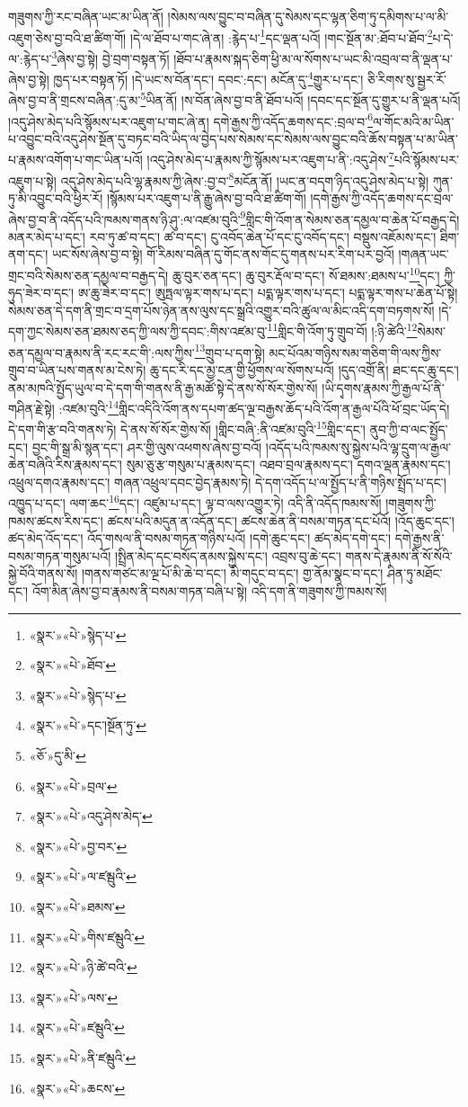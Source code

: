གཟུགས་ཀྱི་རང་བཞིན་ཡང་མ་ཡིན་ནོ། །སེམས་ལས་བྱུང་བ་བཞིན་དུ་སེམས་དང་ལྷན་ཅིག་ཏུ་དམིགས་པ་ལ་མི་འཇུག་ཅེས་བྱ་བའི་ཐ་ཚིག་གོ། །དེ་ལ་ཐོབ་པ་གང་ཞེ་ན། :རྙེད་པ་\footnote{«སྣར་»«པེ་»སྙེད་པ་}དང་ལྡན་པའོ། །གང་སྔོན་མ་:ཐོབ་པ་ཐོབ་\footnote{«སྣར་»«པེ་»ཐོབ་}པ་དེ་ལ་:རྙེད་པ་\footnote{«སྣར་»«པེ་»སྙེད་པ་}ཞེས་བྱ་སྟེ། བྱེ་བྲག་བསྟན་ཏོ། །ཐོབ་པ་རྣམས་སྐད་ཅིག་ཕྱི་མ་ལ་སོགས་པ་ཡང་མི་འབྲལ་བ་ནི་ལྡན་པ་ཞེས་བྱ་སྟེ། ཁྱད་པར་བསྟན་ཏོ། །དེ་ཡང་ས་བོན་དང་། དབང་:དང་། མངོན་དུ་\footnote{«སྣར་»«པེ་»དང་།སྔོན་ཏུ་}གྱུར་པ་དང་། ཅི་རིགས་སུ་སྦྱར་རོ་ཞེས་བྱ་བ་ནི་གྲངས་བཞིན་:དུ་མ་\footnote{«ཅོ་»དུ་མི་}ཡིན་ནོ། །ས་བོན་ཞེས་བྱ་བ་ནི་ཐོབ་པའོ། །དབང་དང་སྔོན་དུ་གྱུར་པ་ནི་ལྡན་པའོ། །འདུ་ཤེས་མེད་པའི་སྙོམས་པར་འཇུག་པ་གང་ཞེ་ན། དགེ་རྒྱས་ཀྱི་འདོད་ཆགས་དང་:བྲལ་བ་\footnote{«སྣར་»«པེ་»བྲལ་}ལ་གོང་མའི་མ་ཡིན་པ་འབྱུང་བའི་འདུ་ཤེས་སྔོན་དུ་བཏང་བའི་ཡིད་ལ་བྱེད་པས་སེམས་དང་སེམས་ལས་བྱུང་བའི་ཆོས་བསྟན་པ་མ་ཡིན་པ་རྣམས་འགོག་པ་གང་ཡིན་པའོ། །འདུ་ཤེས་མེད་པ་རྣམས་ཀྱི་སྙོམས་པར་འཇུག་པ་ནི་:འདུ་ཤེས་\footnote{«སྣར་»«པེ་»འདུ་ཤེས་མེད་}པའི་སྙོམས་པར་འཇུག་པ་སྟེ། འདུ་ཤེས་མེད་པའི་ལྷ་རྣམས་ཀྱི་ཞེས་:བྱ་བ་\footnote{«སྣར་»«པེ་»བྱ་བར་}མངོན་ནོ། །ཡང་ན་བདག་ཉིད་འདུ་ཤེས་མེད་པ་སྟེ། ཀུན་ཏུ་མི་འབྱུང་བའི་ཕྱིར་རོ། །སྙོམས་པར་འཇུག་པ་ནི་རྒྱུ་ཞེས་བྱ་བའི་ཐ་ཚིག་གོ། །དགེ་རྒྱས་ཀྱི་འདོད་ཆགས་དང་བྲལ་ཞེས་བྱ་བ་ནི་འདོད་པའི་ཁམས་གནས་ཉི་ཤུ་:ལ་འཛམ་བུའི་\footnote{«སྣར་»«པེ་»ལ་ཛམྦུའི་}གླིང་གི་འོག་ན་སེམས་ཅན་དམྱལ་བ་ཆེན་པོ་བརྒྱད་དེ། མནར་མེད་པ་དང་། རབ་ཏུ་ཚ་བ་དང་། ཚ་བ་དང་། ངུ་འབོད་ཆེན་པོ་དང་ངུ་འབོད་དང་། བསྡུས་འཇོམས་དང་། ཐིག་ནག་དང་། ཡང་སོས་ཞེས་བྱ་བ་སྟེ། གོ་རིམས་བཞིན་དུ་གོང་ནས་གོང་དུ་གནས་པར་རིག་པར་བྱའོ། །གཞན་ཡང་གྲང་བའི་སེམས་ཅན་དམྱལ་བ་བརྒྱད་དེ། ཆུ་བུར་ཅན་དང་། ཆུ་བུར་རྡོལ་བ་དང་། སོ་ཐམས་:ཐམས་པ་\footnote{«སྣར་»«པེ་»ཐམས་}དང་། ཀྱི་ཧུད་ཟེར་བ་དང་། ཨ་ཆུ་ཟེར་བ་དང་། ཨུཏྤལ་ལྟར་གས་པ་དང་། པདྨ་ལྟར་གས་པ་དང་། པདྨ་ལྟར་གས་པ་ཆེན་པོ་སྟེ། སེམས་ཅན་དེ་དག་ནི་གྲང་བ་དྲག་པོས་ཉེན་ནས་ལུས་དང་སྒྲའི་འགྱུར་བའི་ཚུལ་ལ་མིང་འདི་དག་བཏགས་སོ། །དེ་དག་ཀྱང་སེམས་ཅན་ཐམས་ཅད་ཀྱི་ལས་ཀྱི་དབང་:གིས་འཛམ་བུ་\footnote{«སྣར་»«པེ་»གིས་ཛམྦུའི་}གླིང་གི་འོག་ཏུ་གྲུབ་བོ། །:ཉི་ཚེའི་\footnote{«སྣར་»«པེ་»ཉི་ཚེ་བའི་}སེམས་ཅན་དམྱལ་བ་རྣམས་ནི་རང་རང་གི་:ལས་ཀྱིས་\footnote{«སྣར་»«པེ་»ལས་}གྲུབ་པ་དག་སྟེ། མང་པོའམ་གཉིས་སམ་གཅིག་གི་ལས་ཀྱིས་གྲུབ་བ་ཡིན་པས་གནས་མ་ངེས་ཏེ། ཆུ་དང་རི་དང་མྱ་ངན་གྱི་ཕྱོགས་ལ་སོགས་པའོ། །དུད་འགྲོ་ནི། ཐང་དང་ཆུ་དང་། ནམ་མཁའི་སྤྱོད་ཡུལ་བ་དེ་དག་གི་གནས་ནི་རྒྱ་མཚོ་སྟེ་དེ་ནས་སོ་སོར་གྱེས་སོ། །ཡི་དྭགས་རྣམས་ཀྱི་རྒྱལ་པོ་ནི་གཤིན་རྗེ་སྟེ། :འཛམ་བུའི་\footnote{«སྣར་»«པེ་»ཛམྦུའི་}གླིང་འདིའི་འོག་ནས་དཔག་ཚད་ལྔ་བརྒྱས་ཆོད་པའི་འོག་ན་རྒྱལ་པོའི་ཕོ་བྲང་ཡོད་དེ། དེ་དག་གི་རྩ་བའི་གནས་ཏེ། དེ་ནས་སོ་སོར་གྱེས་སོ། །གླིང་བཞི་:ནི་འཛམ་བུའི་\footnote{«སྣར་»«པེ་»ནི་ཛམྦུའི་}གླིང་དང་། ནུབ་ཀྱི་བ་ལང་སྤྱོད་དང་། བྱང་གི་སྒྲ་མི་སྙན་དང་། ཤར་གྱི་ལུས་འཕགས་ཞེས་བྱ་བའོ། །འདོད་པའི་ཁམས་སུ་སྐྱེས་པའི་ལྷ་དྲུག་ལ་རྒྱལ་ཆེན་བཞིའི་རིས་རྣམས་དང་། སུམ་ཅུ་རྩ་གསུམ་པ་རྣམས་དང་། འཐབ་བྲལ་རྣམས་དང་། དགའ་ལྡན་རྣམས་དང་། འཕྲུལ་དགའ་རྣམས་དང་། གཞན་འཕྲུལ་དབང་བྱེད་རྣམས་ཏེ། དེ་དག་འདོད་པ་ལ་སྤྱོད་པ་ནི་གཉིས་སྤྲོད་པ་དང་། འཁྱུད་པ་དང་། ལག་ཆང་\footnote{«སྣར་»«པེ་»ཆངས་}དང་། འཛུམ་པ་དང་། ལྟ་བ་ལས་འགྱུར་ཏེ། འདི་ནི་འདོད་ཁམས་སོ། །གཟུགས་ཀྱི་ཁམས་ཚངས་རིས་དང་། ཚངས་པའི་མདུན་ན་འདོན་དང་། ཚངས་ཆེན་ནི་བསམ་གཏན་དང་པོའོ། །འོད་ཆུང་དང་། ཚད་མེད་འོད་དང་། འོད་གསལ་ནི་བསམ་གཏན་གཉིས་པའོ། །དགེ་ཆུང་དང་། ཚད་མེད་དགེ་དང་། དགེ་རྒྱས་ནི་བསམ་གཏན་གསུམ་པའོ། །སྤྲིན་མེད་དང་བསོད་ནམས་སྐྱེས་དང་། འབྲས་བུ་ཆེ་དང་། གནས་དེ་རྣམས་ནི་སོ་སོའི་སྐྱེ་བོའི་གནས་སོ། །གནས་གཙང་མ་ལྔ་པོ་མི་ཆེ་བ་དང་། མི་གདུང་བ་དང་། གྱ་ནོམ་སྣང་བ་དང་། ཤིན་ཏུ་མཐོང་དང་། འོག་མིན་ཞེས་བྱ་བ་རྣམས་ནི་བསམ་གཏན་བཞི་པ་སྟེ། འདི་དག་ནི་གཟུགས་ཀྱི་ཁམས་སོ། 